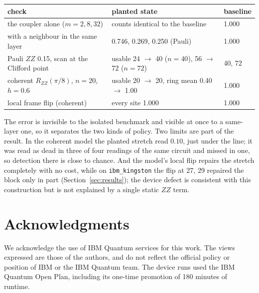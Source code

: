 \documentclass[11pt]{article}
\begin{document}
\begin{center}
\small
\begin{tabular}{lll}
\toprule
check & planted state & baseline \\
\midrule
the coupler alone ($m=2,8,32$) & counts identical to the baseline & 1.000 \\
with a neighbour in the same layer & 0.746, 0.269, 0.250 (Pauli) & 1.000 \\
Pauli $ZZ$ 0.15, scan at the Clifford point & usable 24 $\to$ 40 ($n=40$), 56 $\to$ 72 ($n=72$) & 40, 72 \\
coherent $R_{ZZ}(\pi/8)$, $n=20$, $h=0.6$ & usable 20 $\to$ 20, ring mean 0.40 $\to$ 1.00 & 1.000 \\
local frame flip (coherent) & every site 1.000 & 1.000 \\
\bottomrule
\end{tabular}
\end{center}

The error is invisible to the isolated benchmark and visible at once to a same-layer one, so it separates the two
kinds of policy. Two limits are part of the result. In the coherent model the planted stretch read $0.10$, just under
the line; it was read as dead in three of four readings of the same circuit and missed in one, so detection there is close to
chance. And the model's local flip repairs the stretch completely with no cost, while on \texttt{ibm\_kingston} the flip
at 27, 29 repaired the block only in part (Section~\ref{sec:results}); the device defect is consistent with this
construction but is not explained by a single static $ZZ$ term.

\section*{Acknowledgments}
We acknowledge the use of IBM Quantum services for this work. The views expressed are those of the authors, and do
not reflect the official policy or position of IBM or the IBM Quantum team. The device runs used the IBM Quantum
Open Plan, including its one-time promotion of 180 minutes of runtime.
\end{document}
